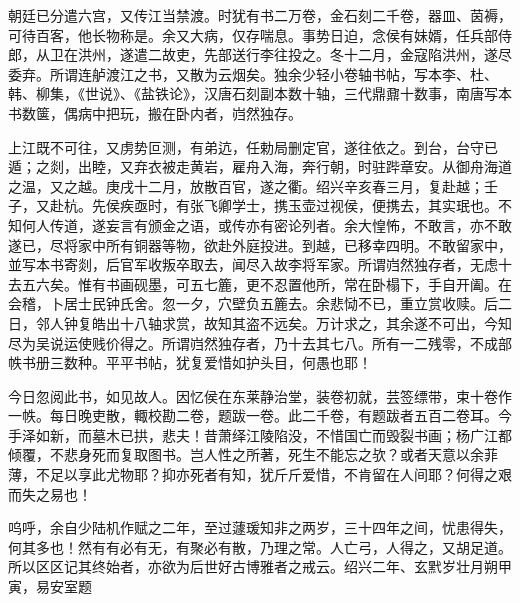 朝廷已分遣六宫，又传江当禁渡。时犹有书二万卷，金石刻二千卷，器皿、茵褥，可待百客，他长物称是。余又大病，仅存喘息。事势日迫，念侯有妹婿，任兵部侍郎，从卫在洪州，遂遣二故吏，先部送行李往投之。冬十二月，金寇陷洪州，遂尽委弃。所谓连舻渡江之书，又散为云烟矣。独余少轻小卷轴书帖，写本李、杜、韩、柳集，《世说》、《盐铁论》，汉唐石刻副本数十轴，三代鼎鼐十数事，南唐写本书数箧，偶病中把玩，搬在卧内者，岿然独存。


上江既不可往，又虏势叵测，有弟迒，任勅局删定官，遂往依之。到台，台守已遁；之剡，出睦，又弃衣被走黄岩，雇舟入海，奔行朝，时驻跸章安。从御舟海道之温，又之越。庚戌十二月，放散百官，遂之衢。绍兴辛亥春三月，复赴越；壬子，又赴杭。先侯疾亟时，有张飞卿学士，携玉壶过视侯，便携去，其实珉也。不知何人传道，遂妄言有颁金之语，或传亦有密论列者。余大惶怖，不敢言，亦不敢遂已，尽将家中所有铜器等物，欲赴外庭投进。到越，已移幸四明。不敢留家中，並写本书寄剡，后官军收叛卒取去，闻尽入故李将军家。所谓岿然独存者，无虑十去五六矣。惟有书画砚墨，可五七簏，更不忍置他所，常在卧榻下，手自开阖。在会稽，卜居士民钟氏舍。忽一夕，穴壁负五簏去。余悲恸不已，重立赏收赎。后二日，邻人钟复皓出十八轴求赏，故知其盗不远矣。万计求之，其余遂不可出，今知尽为吴说运使贱价得之。所谓岿然独存者，乃十去其七八。所有一二残零，不成部帙书册三数种。平平书帖，犹复爱惜如护头目，何愚也耶！


今日忽阅此书，如见故人。因忆侯在东莱静治堂，装卷初就，芸签缥带，束十卷作一帙。每日晚吏散，輙校勘二卷，题跋一卷。此二千卷，有题跋者五百二卷耳。今手泽如新，而墓木已拱，悲夫！昔萧绎江陵陷没，不惜国亡而毁裂书画；杨广江都倾覆，不悲身死而复取图书。岂人性之所著，死生不能忘之欤？或者天意以余菲薄，不足以享此尤物耶？抑亦死者有知，犹斤斤爱惜，不肯留在人间耶？何得之艰而失之易也！


呜呼，余自少陆机作赋之二年，至过蘧瑗知非之两岁，三十四年之间，忧患得失，何其多也！然有有必有无，有聚必有散，乃理之常。人亡弓，人得之，又胡足道。所以区区记其终始者，亦欲为后世好古博雅者之戒云。绍兴二年、玄黓岁壮月朔甲寅，易安室题